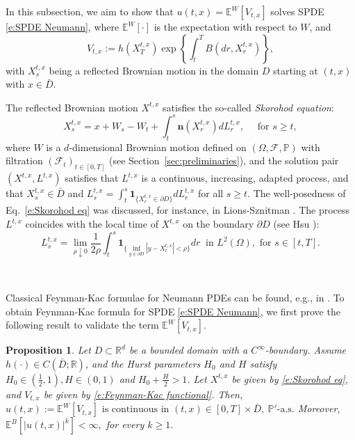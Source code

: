 \documentclass[11pt,reqno]{amsart}
\def\R{\mathbb R}
\def\E{\mathbb E}
\newtheorem{proposition}{Proposition}[section]
\numberwithin{equation}{section}
\begin{document}
In this subsection, we aim to show that $u(t,x)=\E^W[V_{t,x}]$ solves SPDE \eqref{e:SPDE Neumann},  where $\mathbb{E}^{W}[\cdot]$ is the expectation with respect to $W$, and 
\begin{equation}\label{e:Feynman-Kac functional}
V_{t,x}:= h(X^{t,x}_{T})\exp\left\{\int_{t}^{T}B(dr,X^{t,x}_{r})\right\},
\end{equation}
with $X^{t,x}_{s}$ being a reflected Brownian motion in the domain $D$ starting at $(t,x)$ with $x\in \bar{D}$. 

The reflected Brownian motion $X^{t,x}$ satisfies the so-called \emph{Skorohod equation}:
\begin{equation}\label{e:Skorohod eq}
X^{t,x}_{s}=x + W_s - W_t + \int_t^s \mathbf{n}\left(X_r^{t,x}\right) d L_r^{t,x}, \quad \text { for } s \geq t,
\end{equation}
where $W$ is a $d$-dimensional Brownian motion defined on $(\Omega,\mathcal{F},\mathbb{P})$ with filtration $(\mathcal{F}_{t})_{t\in[0,T]}$ (see  Section~\ref{sec:preliminaries}), and the solution pair $(X^{t,x},L^{t,x})$  satisfies that $L^{t,x}$ is a continuous, increasing, adapted process, and that $X^{t,x}_{s}\in \bar{D}$  and  $L^{t,x}_{s} = \int_{t}^{s} \mathbf{1}_{\{X^{t,x}_{r}\in\partial D\}}d L^{t,x}_{r}$ for all $s\ge t$. The well-posedness of Eq.~\eqref{e:Skorohod eq} was discussed, for instance, in Lions-Sznitman \cite{lions1984stochastic}.
The process $L^{t,x}$  coincides with the local time of $X^{t,x}$ on the boundary $\partial D$ (see Hsu \cite[Theorem~3.6]{Hsu}):
\begin{equation*}
L^{t,x}_{s} = \lim_{\rho\downarrow 0}\frac{1}{2\rho}\int_{t}^{s}\mathbf{1}_{\{\inf_{y\in \partial D}|y - X^{t,x}_{r}|<\rho\}}dr ~\text{ in }L^{2}(\Omega),\text{ for } s\in[t,T].
\end{equation*}


\

Classical Feynman-Kac formulae for Neumann PDEs can be found,  e.g., in \cite[Chapter~II, Theorem~5.1]{freidlin1985functional}.  To obtain Feynman-Kac formula for SPDE \eqref{e:SPDE Neumann},  we first prove the following result to validate the term $\E^W[V_{t,x}]$. 


\begin{proposition}\label{prop:app 3}
Let $D\subset \R^d$ be a bounded domain with a $C^{\infty}$-boundary. Assume $h(\cdot)\in C(\bar{D};\R)$, and the Hurst parameters $H_0$ and $H$ satisfy $H_0\in(\frac12,1), H\in(0,1)$ and $H_0+\frac{H}{2}>1$. Let $X^{t,x}$ be given by \eqref{e:Skorohod eq},  and $V_{t,x}$ be given by    \eqref{e:Feynman-Kac functional}. Then, $u(t,x):= \mathbb{E}^{W}\left[V_{t,x}\right]\text{ is continuous in }(t,x)\in[0,T]\times \bar{D},\ \mathbb{P}'\text{-a.s.}$
Moreover, 
$\E^{B}[|u(t,x)|^{k}]<\infty,$ for every $k\ge 1$. 
\end{proposition}
\end{document}
